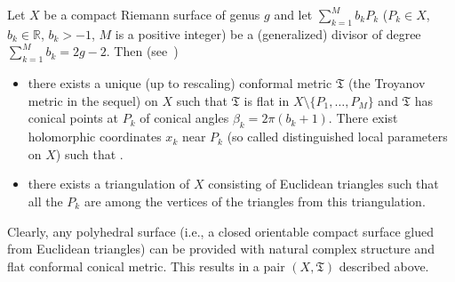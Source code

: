 \documentclass[pdftex]{sigma}
\numberwithin{equation}{section}
\theoremstyle{definition}
\begin{document}
Let $X$ be a compact Riemann surface of genus $g$ and let $\sum_{k=1}^Mb_k P_k$ ($P_k\in X$, $b_k\in {\mathbb R}$, ${b_k>-1}$, $M$ is a positive integer) be a (generalized) divisor of degree $\sum_{k=1}^M b_k=2g-2$. Then (see~\cite{Troyanov})
\begin{itemize}\itemsep=0pt
\item there exists a unique (up to rescaling) conformal metric $\mathfrak{T}$ (the Troyanov metric in the sequel) on $X$ such that $\mathfrak{T}$ is flat
in $X\setminus\{P_1, \dots, P_M\}$ and $\mathfrak{T}$ has conical points at $P_k$ of conical angles $\beta_k=2\pi(b_k+1) $. There exist holomorphic coordinates $x_k$ near $P_k$ (so called distinguished local parameters on $X$) such that .

\item there exists a triangulation of $X$ consisting of Euclidean triangles such that all the $P_k$ are among the vertices of the triangles from this triangulation.
\end{itemize}

Clearly, any polyhedral surface (i.e., a closed orientable compact surface glued from Euclidean triangles) can be provided with natural complex structure and flat conformal conical metric. This results in a pair $(X, \mathfrak{T})$ described above.
\end{document}
